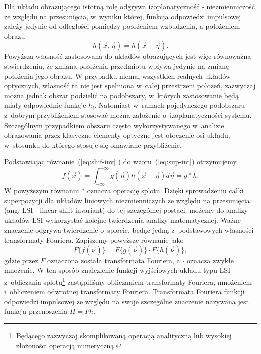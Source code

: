 Dla układu obrazującego istotną rolę odgrywa izoplanatyczność - niezmienniczość ze względu na przesunięcia, w~wyniku której, funkcja odpowiedzi impulsowej zależy jedynie od odległości pomiędzy położeniem wzbudzenia, a położeniem obrazu
\begin{equation}
h(\vec{x},\vec{\eta})=h(\vec{x}-\vec{\eta}).
\label{eq:shif-inv}
\end{equation}
Powyższa własność zastosowana do układów obrazujących jest więc równoważna stwierdzeniu, że zmiana położenia przedmiotu wpływa jedynie na zmianę położenia jego obrazu. W przypadku niemal wszystkich realnych układów optycznych, własność ta nie jest spełniona w~całej przestrzeni położeń, zazwyczaj można jednak obszar podzielić na podobszary, w~których zastosowanie będą miały odpowiednie funkcje $h_i$. Natomiast w~ramach pojedynczego podobszaru z~dobrym przybliżeniem stosować można założenie o~izoplanatyczności systemu. Szczególnym przypadkiem obszaru często wykorzystywanego w~analizie obrazowania przez klasyczne elementy optyczne jest otoczenie osi układu, w~stosunku do którego stosuje się omawiane przybliżenie.

Podstawiając równanie~(\ref{eq:shif-inv} ) do wzoru~(\ref{eq:sup-int}) otrzymujemy
\begin{equation}
f(\vec{x})=\int_{-\infty}^{+\infty} g(\vec{\eta})  h(\vec{x}-\vec{\eta}) d \vec{\eta} = g \ast h.
\label{eq:splot}
\end{equation}
W powyższym równaniu $\ast$ oznacza operację splotu. Dzięki sprowadzeniu całki superpozycji dla układów liniowych niezmienniczych ze względu na przesunięcia (ang. LSI - linear shift-invariant) do tej szczególnej postaci, możemy do analizy układów LSI wykorzystać kolejne twierdzenia analizy matematycznej. Ważne znaczenie odgrywa twierdzenie o~splocie, będąc jedną z~podstawowych własności transformaty Fouriera. Zapiszemy powyższe równanie jako
\begin{equation}
F\{f(\vec{\nu})\} = F\{g(\vec{\nu})\} \cdot F\{h(\vec{\nu})\},
\label{eq:transfer-mult}
\end{equation}
gdzie przez $F$ oznaczona została transformata Fouriera, a $\cdot$ oznacza zwykłe mnożenie. W ten sposób znalezienie funkcji wyjściowych układu typu LSI z~obliczania splotu\footnote{Będącego zazwyczaj skomplikowaną operacją analityczną lub wysokiej złożoności operacją numeryczną.} zastąpiliśmy obliczaniem transformaty Fouriera, mnożeniem i~obliczeniem odwrotnej transformaty Fouriera. Transformata Fouriera funkcji odpowiedzi impulsowej ze względu na swoje szczególne znaczenie nazywana jest funkcją przenoszenia $H=F{h}$.

